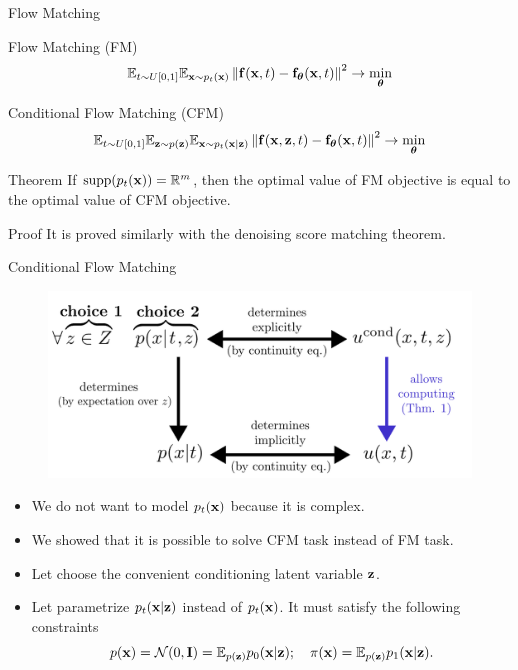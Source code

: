 \begin{frame}{Flow Matching}
	\begin{block}{Flow Matching (FM)}
		\vspace{-0.3cm}
		\[
			\mathbb{E}_{t \sim U[0, 1]} \mathbb{E}_{\mathbf{x} \sim p_t(\mathbf{x})}\left\| \mathbf{f}(\mathbf{x}, t) - \mathbf{f}_{\boldsymbol{\theta}}(\mathbf{x}, t) \right\|^2 \rightarrow \min_{\boldsymbol{\theta}}
		\]
		\vspace{-0.3cm}
	\end{block}
	\begin{block}{Conditional Flow Matching (CFM)}
		\vspace{-0.3cm}
		\[
			\mathbb{E}_{t \sim U[0, 1]} \mathbb{E}_{\mathbf{z} \sim p(\mathbf{z})} \mathbb{E}_{\mathbf{x} \sim p_t(\mathbf{x} | \mathbf{z})}\left\| \mathbf{f}(\mathbf{x}, \mathbf{z}, t) - \mathbf{f}_{\boldsymbol{\theta}}(\mathbf{x}, t) \right\|^2 \rightarrow \min_{\boldsymbol{\theta}}
		\]
		\vspace{-0.3cm}
	\end{block}
	\begin{block}{Theorem}
		If $\text{supp}(p_t(\mathbf{x})) = \mathbb{R}^m$, then the optimal value of FM objective is equal to the optimal value of CFM objective.
	\end{block}
	\begin{block}{Proof}
		It is proved similarly with the denoising score matching theorem.
	\end{block}
\end{frame}
\begin{frame}{Conditional Flow Matching}
	\begin{figure}
		\centering
		\includegraphics[width=0.75\linewidth]{figs/cfm_uncond_to_cond}
	\end{figure}
	\begin{itemize}
		\item We do not want to model $p_t(\mathbf{x})$ because it is complex.
		\item We showed that it is possible to solve CFM task instead of FM task.
		\item Let choose the convenient conditioning latent variable $\mathbf{z}$.
		\item Let parametrize $p_t(\mathbf{x} | \mathbf{z})$ instead of $p_t(\mathbf{x})$. It must satisfy the following constraints
		\[
			p(\mathbf{x}) = \mathcal{N}(0, \mathbf{I}) = \mathbb{E}_{p(\mathbf{z})} p_0(\mathbf{x} | \mathbf{z}); \quad \pi(\mathbf{x}) = \mathbb{E}_{p(\mathbf{z})} p_1(\mathbf{x} | \mathbf{z}).
		\]
	\end{itemize}
\end{frame}
